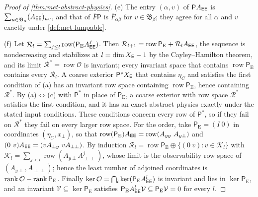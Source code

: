 \begin{proof}[Proof of \cref{thm:met-abstract-physics}]
(e) The entry $(\alpha,v)$ of $\mathsf PA_{\mathsf{E}\mathsf{E}}$ is $\sum_{u\in\mathfrak B_\alpha}(A_{\mathsf{E}\mathsf{E}})_{uv}$, and that of $\bar F\mathsf P$ is $\bar F_{\alpha\beta}$ for $v\in\mathfrak B_\beta$; they agree for all $\alpha$ and $v$ exactly under \cref{def:met-lumpable}.

(f) Let $\mathcal R_l=\sum_{j\le l}\operatorname{row}(\mathsf P_{\mathrm E}A_{\mathsf{E}\mathsf{E}}^j)$. Then $\mathcal R_{l+1}=\operatorname{row}\mathsf P_{\mathrm E}+\mathcal R_lA_{\mathsf{E}\mathsf{E}}$, the sequence is nondecreasing and stabilizes at $l=\dim X_{\mathsf{E}}-1$ by the Cayley--Hamilton theorem, and its limit $\mathcal R^\ast=\operatorname{row}\mathcal O$ is invariant; every invariant space that contains $\operatorname{row}\mathsf P_{\mathrm E}$ contains every $\mathcal R_l$. A coarse exterior $\mathsf P^\ast X_{\mathsf{E}}$ that contains $\eta_C$ and satisfies the first condition of (a) has an invariant row space containing $\operatorname{row}\mathsf P_{\mathrm E}$, hence containing $\mathcal R^\ast$. By (a)$\Leftrightarrow$(c) with $\mathsf P^\ast$ in place of $\mathsf P_{\mathrm E}$, a coarse exterior with row space $\mathcal R^\ast$ satisfies the first condition, and it has an exact abstract physics exactly under the stated input conditions. These conditions concern every row of $\mathsf P^\ast$, so if they fail on $\mathcal R^\ast$ they fail on every larger row space. For the order, take $\mathsf P_{\mathrm E}=(I\ 0)$ in coordinates $(\eta_C,x_\perp)$, so that $\operatorname{row}(\mathsf P_{\mathrm E})A_{\mathsf{E}\mathsf{E}}=\operatorname{row}(A_{yy}\ A_{y\perp})$ and $(0\ v)A_{\sE\sE}=(vA_{\perp y}\ vA_{\perp\perp})$. By induction $\mathcal R_l=\operatorname{row}\mathsf P_{\mathrm E}\oplus\{(0\ v):v\in\mathcal K_l\}$ with $\mathcal K_l=\sum_{j<l}\operatorname{row}(A_{y\perp}A_{\perp\perp}^j)$, whose limit is the observability row space of $(A_{y\perp},A_{\perp\perp})$; hence the least number of adjoined coordinates is $\operatorname{rank}\mathcal O-\operatorname{rank}\mathsf P_{\mathrm E}$. Finally $\ker\mathcal O=\bigcap_l\ker(\mathsf P_{\mathrm E}A_{\mathsf{E}\mathsf{E}}^l)$ is invariant and lies in $\ker\mathsf P_{\mathrm E}$, and an invariant $\mathcal V\subseteq\ker\mathsf P_{\mathrm E}$ satisfies $\mathsf P_{\mathrm E}A_{\mathsf{E}\mathsf{E}}^l\mathcal V\subseteq\mathsf P_{\mathrm E}\mathcal V=0$ for every $l$.
\end{proof}

